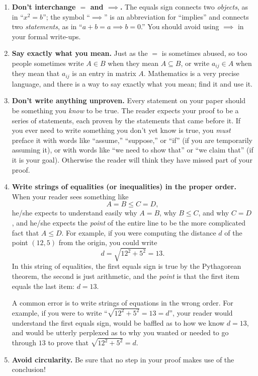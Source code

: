 \begin{enumerate}
\item \textbf{Don't interchange ${=}$ and ${\implies}$.} The equals sign connects two \emph{objects}, as in ``$x^2=b$''; the symbol ``$\implies$'' is an abbreviation for ``implies'' and connects two \emph{statements}, as in ``$a+b=a \implies b=0$.''  You should avoid using $\implies$ in your formal write-ups.

\item \textbf{Say exactly what you mean.} Just as the $=$ is sometimes abused, so too people sometimes write $A\in B$ when they mean $A\subseteq B$, or write $a_{ij}\in A$ when they mean that $a_{ij}$ is an entry in matrix $A$. Mathematics is a very precise language, and there is a way to say exactly what you mean; find it and use it.

\item \textbf{Don't write anything unproven.} Every statement on your paper should be something you \emph{know} to be true. The reader expects your proof to be a series of statements, each proven by the statements that came before it. If you ever need to write something you don't yet know is true, you \emph{must} preface it with words like ``assume,'' ``suppose,'' or ``if'' (if you are temporarily assuming it), or with words like ``we need to show that'' or ``we claim that'' (if it is your goal). Otherwise the reader will think they have missed part of your proof.

\item \textbf{Write strings of equalities (or inequalities) in the proper order.} When your reader sees something like
\[
A=B\leq C=D,
\]
he/she expects to understand easily why $A=B$, why $B\leq C$, and why $C=D$, and he/she expects the \emph{point} of the entire line to be the more complicated fact that $A\leq D$. For example, if you were computing the distance $d$ of the point $(12,5)$ from the origin, you could write
\[
d = \sqrt{12^2+5^2} = 13.
\]
In this string of equalities, the first equals sign is true by the Pythagorean theorem, the second is just arithmetic, and the \emph{point} is that the first item equals the last item: $d=13$.

A common error is to write strings of equations in the wrong order. For example, if you were to write ``$\sqrt{12^2+5^2}=13=d$'', your reader would understand the first equals sign, would be baffled as to how we know $d=13$, and would be utterly perplexed as to why you wanted or needed to go through $13$ to prove that $\sqrt{12^2+5^2}=d$.

\item \textbf{Avoid circularity.}  Be sure that no step in your proof makes use of the conclusion!


\end{enumerate}
